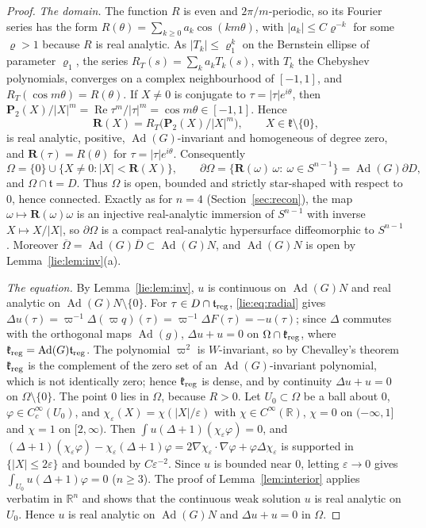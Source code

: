 \documentclass[11pt]{amsart}
\theoremstyle{definition}
\theoremstyle{remark}
\numberwithin{equation}{section}
\newcommand{\R}{\mathbb{R}}
\newcommand{\eps}{\varepsilon}
\DeclareMathOperator{\re}{Re}
\newcommand{\Ad}{\operatorname{Ad}}
\newcommand{\kf}{\mathfrak{k}}
\newcommand{\tf}{\mathfrak{t}}
\begin{document}
\begin{proof}
\emph{The domain.} The function $R$ is even and $2\pi/m$-periodic, so its Fourier series has the form $R(\theta)=\sum_{k\geq0}a_k\cos(km\theta)$, with $|a_k|\leq C\varrho^{-k}$ for some $\varrho>1$ because $R$ is real analytic. As $|T_k|\leq\varrho_1^k$ on the Bernstein ellipse of parameter $\varrho_1$, the series $R_T(s)=\sum_ka_kT_k(s)$, with $T_k$ the Chebyshev polynomials, converges on a complex neighbourhood of $[-1,1]$, and $R_T(\cos m\theta)=R(\theta)$. If $X\neq0$ is conjugate to $\tau=|\tau|e^{i\theta}$, then $\mathbf P_2(X)/|X|^m=\re\tau^m/|\tau|^m=\cos m\theta\in[-1,1]$. Hence
\[
\mathbf R(X)=R_T\big(\mathbf P_2(X)/|X|^m\big),\qquad X\in\kf\setminus\{0\},
\]
is real analytic, positive, $\Ad(G)$-invariant and homogeneous of degree zero, and $\mathbf R(\tau)=R(\theta)$ for $\tau=|\tau|e^{i\theta}$. Consequently
\[
\Omega=\{0\}\cup\{X\neq0:|X|<\mathbf R(X)\},\qquad\partial\Omega=\{\mathbf R(\omega)\,\omega:\ \omega\in S^{n-1}\}=\Ad(G)\partial D,
\]
and $\Omega\cap\tf=D$. Thus $\Omega$ is open, bounded and strictly star-shaped with respect to $0$, hence connected. Exactly as for $n=4$ (Section~\ref{sec:recon}), the map $\omega\mapsto\mathbf R(\omega)\omega$ is an injective real-analytic immersion of $S^{n-1}$ with inverse $X\mapsto X/|X|$, so $\partial\Omega$ is a compact real-analytic hypersurface diffeomorphic to $S^{n-1}$. Moreover $\overline\Omega=\Ad(G)\overline D\subset\Ad(G)N$, and $\Ad(G)N$ is open by Lemma~\ref{lie:lem:inv}(a).

\emph{The equation.} By Lemma~\ref{lie:lem:inv}, $u$ is continuous on $\Ad(G)N$ and real analytic on $\Ad(G)N\setminus\{0\}$. For $\tau\in D\cap\tf_{\rm reg}$, \eqref{lie:eq:radial} gives $\Delta u(\tau)=\varpi^{-1}\Delta(\varpi q)(\tau)=\varpi^{-1}\Delta F(\tau)=-u(\tau)$; since $\Delta$ commutes with the orthogonal maps $\Ad(g)$, $\Delta u+u=0$ on $\Omega\cap\kf_{\rm reg}$, where $\kf_{\rm reg}=\Ad(G)\tf_{\rm reg}$. The polynomial $\varpi^2$ is $W$-invariant, so by Chevalley's theorem $\kf_{\rm reg}$ is the complement of the zero set of an $\Ad(G)$-invariant polynomial, which is not identically zero; hence $\kf_{\rm reg}$ is dense, and by continuity $\Delta u+u=0$ on $\Omega\setminus\{0\}$. The point $0$ lies in $\Omega$, because $R>0$. Let $U_0\subset\Omega$ be a ball about $0$, $\varphi\in C^\infty_c(U_0)$, and $\chi_\eps(X)=\chi(|X|/\eps)$ with $\chi\in C^\infty(\R)$, $\chi=0$ on $(-\infty,1]$ and $\chi=1$ on $[2,\infty)$. Then $\int u(\Delta+1)(\chi_\eps\varphi)=0$, and $(\Delta+1)(\chi_\eps\varphi)-\chi_\eps(\Delta+1)\varphi=2\nabla\chi_\eps\cdot\nabla\varphi+\varphi\Delta\chi_\eps$ is supported in $\{|X|\leq2\eps\}$ and bounded by $C\eps^{-2}$. Since $u$ is bounded near $0$, letting $\eps\to0$ gives $\int_{U_0}u(\Delta+1)\varphi=0$ ($n\geq3$). The proof of Lemma~\ref{lem:interior} applies verbatim in $\R^n$ and shows that the continuous weak solution $u$ is real analytic on $U_0$. Hence $u$ is real analytic on $\Ad(G)N$ and $\Delta u+u=0$ in $\Omega$.


\end{proof}
\end{document}

